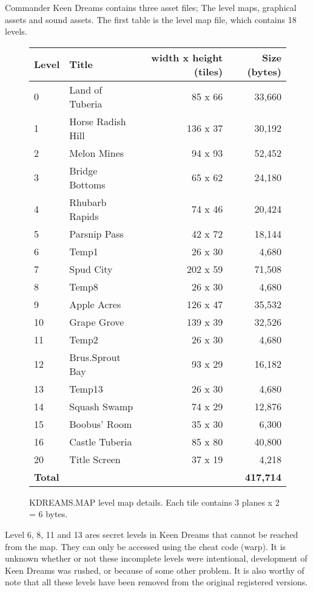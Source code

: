 \documentclass[book.tex]{subfiles}
\begin{document}
\label{asset_details}


Commander Keen Dreams contains three asset files; The level maps, graphical assets and sound assets. The first table is the level map file, which contains 18 levels.

\begin{figure}[H]
\centering
{\renewcommand{\arraystretch}{1.1} %
\begin{tabularx}{\textwidth}[c]{X X r r }
  \hline
  \textbf{Level} & \textbf{Title} & \textbf{width x height (tiles)} & \textbf{Size (bytes)}\\ \hline
	0 & Land of Tuberia & 85 x 66 &  33,660 \\
	1 & Horse Radish Hill & 136 x 37 &   30,192 \\ 
	2 & Melon Mines & 94 x 93 &   52,452 \\
	3 & Bridge Bottoms & 65 x 62 &  24,180 \\
	4 & Rhubarb Rapids & 74 x 46 &  20,424 \\
	5 & Parsnip Pass & 42 x 72 &   18,144 \\
	6 & Temp1 & 26 x 30 &   4,680 \\
	7 & Spud City & 202 x 59 &  71,508 \\
	8 & Temp8 & 26 x 30 &  4,680 \\
	9 & Apple Acres & 126 x 47 &  35,532 \\
	10 & Grape Grove & 139 x 39 &  32,526 \\
	11 & Temp2 & 26 x 30 &  4,680 \\
	12 & Brus.Sprout Bay & 93 x 29 &  16,182 \\
	13 & Temp13 & 26 x 30 &  4,680 \\
	14 & Squash Swamp & 74 x 29 &  12,876 \\
	15 & Boobus' Room & 35 x 30 &  6,300 \\
	16 & Castle Tuberia & 85 x 80 &  40,800 \\
	20 & Title Screen & 37 x 19 &  4,218 \\ \hline
	\textbf{Total} & \multicolumn{3}{r}{\textbf{417,714}} \\ \hline
\end{tabularx}
}
\caption{KDREAMS.MAP level map details. Each tile contains 3 planes x 2 = 6 bytes.}
\end{figure}

\par
Level 6, 8, 11 and 13 ares secret levels in Keen Dreams that cannot be reached from the map. They can only be accessed using the cheat code  (warp). It is unknown whether or not these incomplete levels were intentional, development of Keen Dreams was rushed, or because of some other problem. It is also worthy of note that all these levels have been removed from the original registered versions.\\
\end{document}
